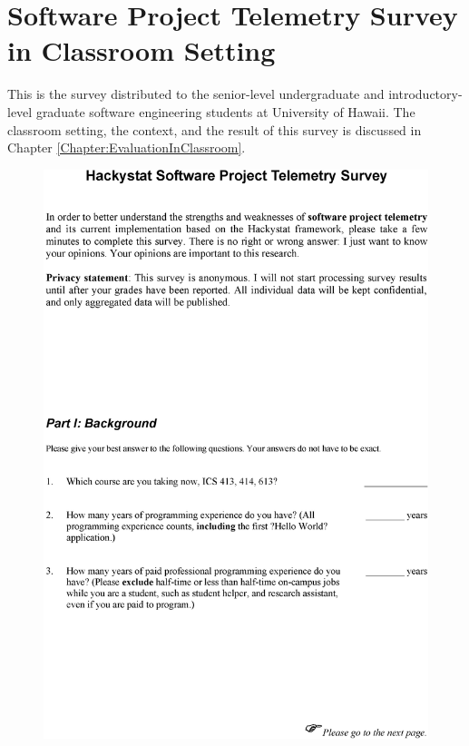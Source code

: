 \chapter{Software Project Telemetry Survey in Classroom Setting}
\label{Appendix:EvaluationInClassroom}

This is the survey distributed to the senior-level undergraduate and introductory-level graduate software engineering students at University of Hawaii. The classroom setting, the context, and the result of this survey is discussed in Chapter \ref{Chapter:EvaluationInClassroom}.

\newpage

\begin{figure}[p]
  \includegraphics[height=1.00\textheight]{figures/ClassroomSurveyPage1}
\end{figure}

